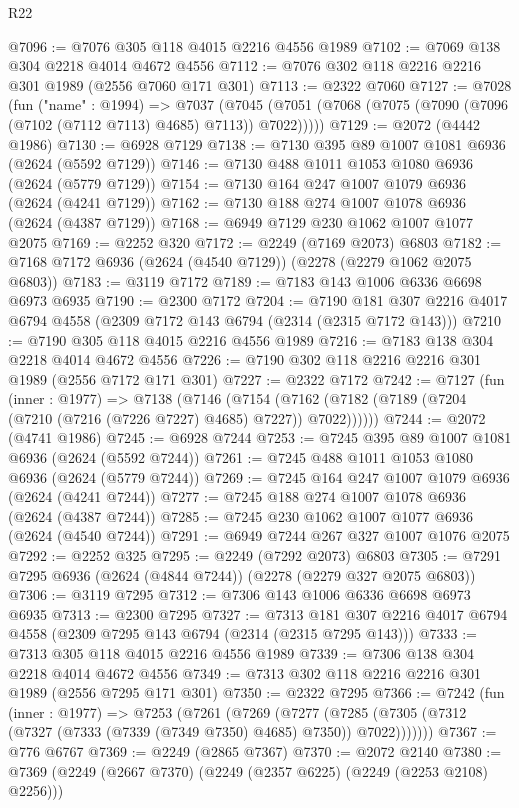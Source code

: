 \begin{lexlean}{R22}
\begin{coremodule}
@7096 := @7076 @305 @118 @4015 @2216 @4556 @1989
@7102 := @7069 @138 @304 @2218 @4014 @4672 @4556
@7112 := @7076 @302 @118 @2216 @2216 @301 @1989 (@2556 @7060 @171 @301)
@7113 := @2322 @7060
@7127 := @7028
    (fun ("name" : @1994) =>
    @7037 (@7045 (@7051 (@7068 (@7075 (@7090 (@7096 (@7102 (@7112 @7113) @4685) @7113)) @7022)))))
@7129 := @2072 (@4442 @1986)
@7130 := @6928 @7129
@7138 := @7130 @395 @89 @1007 @1081 @6936 (@2624 (@5592 @7129))
@7146 := @7130 @488 @1011 @1053 @1080 @6936 (@2624 (@5779 @7129))
@7154 := @7130 @164 @247 @1007 @1079 @6936 (@2624 (@4241 @7129))
@7162 := @7130 @188 @274 @1007 @1078 @6936 (@2624 (@4387 @7129))
@7168 := @6949 @7129 @230 @1062 @1007 @1077 @2075
@7169 := @2252 @320
@7172 := @2249 (@7169 @2073) @6803
@7182 := @7168 @7172 @6936 (@2624 (@4540 @7129)) (@2278 (@2279 @1062 @2075 @6803))
@7183 := @3119 @7172
@7189 := @7183 @143 @1006 @6336 @6698 @6973 @6935
@7190 := @2300 @7172
@7204 := @7190 @181 @307 @2216 @4017 @6794 @4558 (@2309 @7172 @143 @6794 (@2314 (@2315 @7172 @143)))
@7210 := @7190 @305 @118 @4015 @2216 @4556 @1989
@7216 := @7183 @138 @304 @2218 @4014 @4672 @4556
@7226 := @7190 @302 @118 @2216 @2216 @301 @1989 (@2556 @7172 @171 @301)
@7227 := @2322 @7172
@7242 := @7127
    (fun (inner : @1977) =>
    @7138
      (@7146
        (@7154 (@7162 (@7182 (@7189 (@7204 (@7210 (@7216 (@7226 @7227) @4685) @7227)) @7022))))))
@7244 := @2072 (@4741 @1986)
@7245 := @6928 @7244
@7253 := @7245 @395 @89 @1007 @1081 @6936 (@2624 (@5592 @7244))
@7261 := @7245 @488 @1011 @1053 @1080 @6936 (@2624 (@5779 @7244))
@7269 := @7245 @164 @247 @1007 @1079 @6936 (@2624 (@4241 @7244))
@7277 := @7245 @188 @274 @1007 @1078 @6936 (@2624 (@4387 @7244))
@7285 := @7245 @230 @1062 @1007 @1077 @6936 (@2624 (@4540 @7244))
@7291 := @6949 @7244 @267 @327 @1007 @1076 @2075
@7292 := @2252 @325
@7295 := @2249 (@7292 @2073) @6803
@7305 := @7291 @7295 @6936 (@2624 (@4844 @7244)) (@2278 (@2279 @327 @2075 @6803))
@7306 := @3119 @7295
@7312 := @7306 @143 @1006 @6336 @6698 @6973 @6935
@7313 := @2300 @7295
@7327 := @7313 @181 @307 @2216 @4017 @6794 @4558 (@2309 @7295 @143 @6794 (@2314 (@2315 @7295 @143)))
@7333 := @7313 @305 @118 @4015 @2216 @4556 @1989
@7339 := @7306 @138 @304 @2218 @4014 @4672 @4556
@7349 := @7313 @302 @118 @2216 @2216 @301 @1989 (@2556 @7295 @171 @301)
@7350 := @2322 @7295
@7366 := @7242
    (fun (inner : @1977) =>
    @7253
      (@7261
        (@7269
          (@7277 (@7285 (@7305 (@7312 (@7327 (@7333 (@7339 (@7349 @7350) @4685) @7350)) @7022)))))))
@7367 := @776 @6767
@7369 := @2249 (@2865 @7367)
@7370 := @2072 @2140
@7380 := @7369 (@2249 (@2667 @7370) (@2249 (@2357 @6225) (@2249 (@2253 @2108) @2256)))

\end{coremodule}
\end{lexlean}
